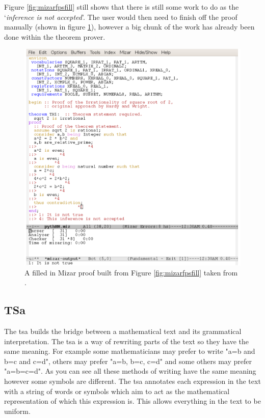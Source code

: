 Figure \ref{fig:mizarfpsfill} still shows that there is still some work to do as
the `\emph{inference is not accepted}'. The user would then need to finish off
the proof manually (shown in figure \ref{fig:mizarfpsfinished}), however a big
chunk of the work has already been done within the theorem prover.

\begin{figure}[H]
\begin{center}
\includegraphics[scale=0.7]{Figures/Background/mizarskelfinished.png}
\end{center}
\caption{A filled in Mizar proof built from Figure \ref{fig:mizarfpsfill} taken from \cite{krzysztofphd}. \label{fig:mizarfpsfinished}}
\end{figure}

\subsection{TSa}
\label{subsec:tsa}

The \gls{tsa} builds the bridge between a mathematical text and its grammatical
interpretation. The \gls{tsa} is a way of rewriting parts of the text so they
have the same meaning. For example some mathematicians may prefer to write "a=b
and b=c and c=d", others may prefer "a=b, b=c, c=d" and some others may prefer
"a=b=c=d". As you can see all these methods of writing have the same meaning
however some symbols are different. The \gls{tsa} annotates each expression in
the text with a string of words or symbols which aim to act as the mathematical
representation of which this expression is. This allows everything in the text
to be uniform.

